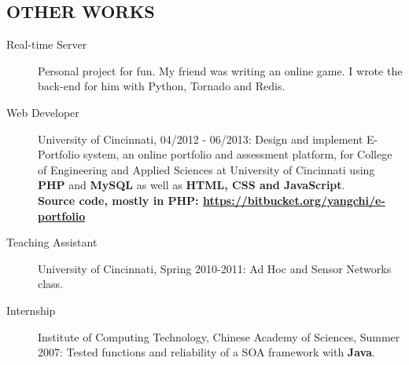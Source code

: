 \documentclass[line]{res}
\begin{document}
\begin{resume}
	\section{OTHER WORKS}
	\begin{description}
		\item[Real-time Server] Personal project for fun. My friend was writing an online game. I wrote the back-end for him with Python, Tornado and Redis.
		\item[Web Developer] University of Cincinnati, 04/2012 - 06/2013: Design and implement E-Portfolio system, an online portfolio and assessment platform, for College of Engineering and Applied Sciences at University of Cincinnati using \textbf{PHP} and \textbf{MySQL} as well as \textbf{HTML, CSS and JavaScript}. \\
		\textbf{Source code, mostly in PHP: \url{https://bitbucket.org/yangchi/e-portfolio} }
		\item[Teaching Assistant] University of Cincinnati, Spring 2010-2011: Ad Hoc and Sensor Networks class.
		\item[Internship] Institute of Computing Technology, Chinese Academy of Sciences, Summer 2007: Tested functions and reliability of a SOA framework with \textbf{Java}.
	\end{description}

\end{resume}
\end{document}
